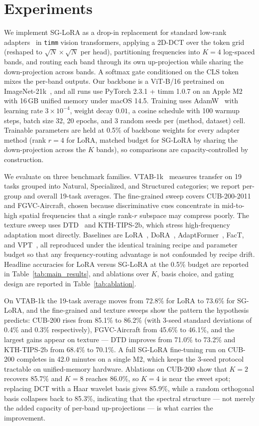 \documentclass{article}
\begin{document}
\section{Experiments}
We implement SG-LoRA as a drop-in replacement for standard low-rank adapters~\citep{hu2022lora} in \texttt{timm} vision transformers, applying a 2D-DCT over the token grid (reshaped to $\sqrt{N}\times\sqrt{N}$ per head), partitioning frequencies into $K{=}4$ log-spaced bands, and routing each band through its own up-projection while sharing the down-projection across bands. A softmax gate conditioned on the CLS token mixes the per-band outputs. Our backbone is a ViT-B/16 pretrained on ImageNet-21k~\citep{dosovitskiy2021vit}, and all runs use PyTorch 2.3.1 + timm 1.0.7 on an Apple M2 with 16\,GB unified memory under macOS 14.5. Training uses AdamW~\citep{loshchilov2019adamw} with learning rate $3\times10^{-4}$, weight decay $0.01$, a cosine schedule with 100 warmup steps, batch size 32, 20 epochs, and 3 random seeds per (method, dataset) cell. Trainable parameters are held at 0.5\% of backbone weights for every adapter method (rank $r{=}4$ for LoRA, matched budget for SG-LoRA by sharing the down-projection across the $K$ bands), so comparisons are capacity-controlled by construction.

We evaluate on three benchmark families. VTAB-1k~\citep{zhai2019vtab} measures transfer on 19 tasks grouped into Natural, Specialized, and Structured categories; we report per-group and overall 19-task averages. The fine-grained sweep covers CUB-200-2011~\citep{wah2011cub} and FGVC-Aircraft, chosen because discriminative cues concentrate in mid-to-high spatial frequencies that a single rank-$r$ subspace may compress poorly. The texture sweep uses DTD~\citep{cimpoi2014dtd} and KTH-TIPS-2b, which stress high-frequency adaptation most directly. Baselines are LoRA~\citep{hu2022lora}, DoRA~\citep{liu2024dora}, AdaptFormer~\citep{chen2022adaptformer}, FacT, and VPT~\citep{jia2022vpt}, all reproduced under the identical training recipe and parameter budget so that any frequency-routing advantage is not confounded by recipe drift. Headline accuracies for LoRA versus SG-LoRA at the 0.5\% budget are reported in Table~\ref{tab:main_results}, and ablations over $K$, basis choice, and gating design are reported in Table~\ref{tab:ablation}.

On VTAB-1k the 19-task average moves from 72.8\% for LoRA to 73.6\% for SG-LoRA, and the fine-grained and texture sweeps show the pattern the hypothesis predicts: CUB-200 rises from 85.1\% to 86.2\% (with 3-seed standard deviations of 0.4\% and 0.3\% respectively), FGVC-Aircraft from 45.6\% to 46.1\%, and the largest gains appear on texture — DTD improves from 71.0\% to 73.2\% and KTH-TIPS-2b from 68.4\% to 70.1\%. A full SG-LoRA fine-tuning run on CUB-200 completes in 42.0 minutes on a single M2, which keeps the 3-seed protocol tractable on unified-memory hardware. Ablations on CUB-200 show that $K{=}2$ recovers 85.7\% and $K{=}8$ reaches 86.0\%, so $K{=}4$ is near the sweet spot; replacing DCT with a Haar wavelet basis gives 85.9\%, while a random orthogonal basis collapses back to 85.3\%, indicating that the spectral structure — not merely the added capacity of per-band up-projections — is what carries the improvement.
\end{document}
